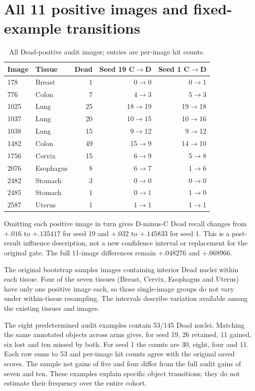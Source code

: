 \section{All 11 positive images and fixed-example transitions}
\begin{table}[H]\centering\small\begin{tabular}{llrrr}\toprule
Image & Tissue & Dead & Seed 19 C$\to$D & Seed 1 C$\to$D\\\midrule
178 & Breast & 1 & 0$\to$0 & 0$\to$1\\
776 & Colon & 7 & 4$\to$3 & 5$\to$3\\
1025 & Lung & 25 & 18$\to$19 & 19$\to$18\\
1037 & Lung & 20 & 10$\to$15 & 10$\to$16\\
1038 & Lung & 15 & 9$\to$12 & 9$\to$12\\
1482 & Colon & 49 & 15$\to$9 & 14$\to$10\\
1756 & Cervix & 15 & 6$\to$9 & 5$\to$8\\
2076 & Esophagus & 8 & 6$\to$7 & 1$\to$6\\
2482 & Stomach & 3 & 0$\to$0 & 0$\to$0\\
2485 & Stomach & 1 & 0$\to$1 & 1$\to$0\\
2587 & Uterus & 1 & 1$\to$1 & 1$\to$1\\\bottomrule
\end{tabular}\caption{All Dead-positive audit images; entries are per-image hit counts.}\end{table}
Omitting each positive image in turn gives D-minus-C Dead recall changes from $+.016$ to $+.135417$ for seed 19 and $+.032$ to $+.145833$ for seed 1. This is a post-result influence description, not a new confidence interval or replacement for the original gate. The full 11-image differences remain $+.048276$ and $+.068966$.

The original bootstrap samples images containing interior Dead nuclei within each tissue. Four of the seven tissues (Breast, Cervix, Esophagus and Uterus) have only one positive image each, so those single-image groups do not vary under within-tissue resampling. The intervals describe variation available among the existing tissues and images.

The eight predetermined audit examples contain 53/145 Dead nuclei. Matching the same annotated objects across arms gives, for seed 19, 26 retained, 11 gained, six lost and ten missed by both. For seed 1 the counts are 30, eight, four and 11. Each row sums to 53 and per-image hit counts agree with the original saved scores. The sample net gains of five and four differ from the full audit gains of seven and ten. These examples explain specific object transitions; they do not estimate their frequency over the entire cohort.
